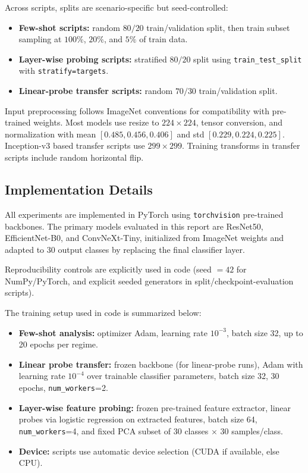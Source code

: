 \documentclass[11pt,a4paper]{article}
\begin{document}
Across scripts, splits are scenario-specific but seed-controlled:
\begin{itemize}
	\item \textbf{Few-shot scripts:} random $80/20$ train/validation split, then train subset sampling at $100\%$, $20\%$, and $5\%$ of train data.
	\item \textbf{Layer-wise probing scripts:} stratified $80/20$ split using \texttt{train\_test\_split} with \texttt{stratify=targets}.
	\item \textbf{Linear-probe transfer scripts:} random $70/30$ train/validation split.
\end{itemize}

Input preprocessing follows ImageNet conventions for compatibility with pre-trained weights. Most models use resize to $224\times224$, tensor conversion, and normalization with mean $[0.485,0.456,0.406]$ and std $[0.229,0.224,0.225]$. Inception-v3 based transfer scripts use $299\times299$. Training transforms in transfer scripts include random horizontal flip.

\subsection{Implementation Details}
All experiments are implemented in PyTorch using \texttt{torchvision} pre-trained backbones. The primary models evaluated in this report are ResNet50, EfficientNet-B0, and ConvNeXt-Tiny, initialized from ImageNet weights and adapted to 30 output classes by replacing the final classifier layer.

Reproducibility controls are explicitly used in code (seed $=42$ for NumPy/PyTorch, and explicit seeded generators in split/checkpoint-evaluation scripts).

The training setup used in code is summarized below:
\begin{itemize}
	\item \textbf{Few-shot analysis:} optimizer Adam, learning rate $10^{-3}$, batch size 32, up to 20 epochs per regime.
	\item \textbf{Linear probe transfer:} frozen backbone (for linear-probe runs), Adam with learning rate $10^{-4}$ over trainable classifier parameters, batch size 32, 30 epochs, \texttt{num\_workers}=2.
	\item \textbf{Layer-wise feature probing:} frozen pre-trained feature extractor, linear probes via logistic regression on extracted features, batch size 64, \texttt{num\_workers}=4, and fixed PCA subset of 30 classes $\times$ 30 samples/class.
	\item \textbf{Device:} scripts use automatic device selection (CUDA if available, else CPU).
\end{itemize}
\end{document}
